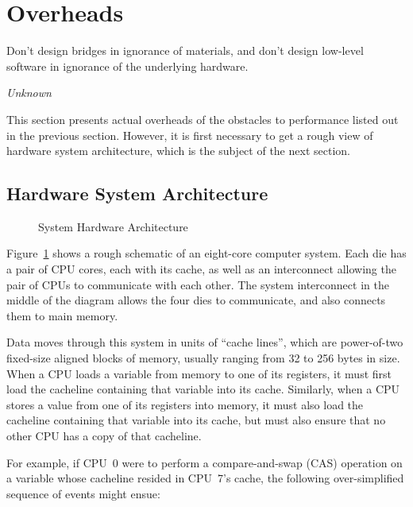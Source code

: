 
\section{Overheads}
\label{sec:cpu:Overheads}
%
\epigraph{Don't design bridges in ignorance of materials, and don't design
	  low-level software in ignorance of the underlying hardware.}
	 {\emph{Unknown}}

This section presents actual overheads of the obstacles to performance
listed out in the previous section.
However, it is first necessary to get a rough view of hardware system
architecture, which is the subject of the next section.

\subsection{Hardware System Architecture}
\label{sec:cpu:Hardware System Architecture}

\begin{figure}[tb]
\centering
{}
\caption{System Hardware Architecture}
\label{fig:cpu:System Hardware Architecture}
\end{figure}

Figure~\ref{fig:cpu:System Hardware Architecture}
shows a rough schematic of an eight-core computer system.
Each die has a pair of CPU cores, each with its cache, as well as an
interconnect allowing the pair of CPUs to communicate with each other.
The system interconnect in the middle of the diagram allows the
four dies to communicate, and also connects them to main memory.

Data moves through this system in units of ``cache lines'', which
are power-of-two fixed-size aligned blocks of memory, usually ranging
from 32 to 256 bytes in size.
When a CPU loads a variable from memory to one of its registers, it must
first load the cacheline containing that variable into its cache.
Similarly, when a CPU stores a value from one of its registers into
memory, it must also load the cacheline containing that variable into
its cache, but must also ensure that no other CPU has a copy of that
cacheline.

For example, if CPU~0 were to perform a compare-and-swap (CAS) operation on a
variable whose cacheline resided in CPU~7's cache, the following
over-simplified sequence of events might ensue:

